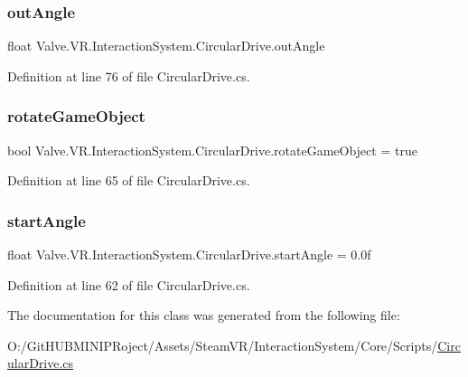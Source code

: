\subsubsection{\texorpdfstring{outAngle}{outAngle}}
{\footnotesize\ttfamily float Valve.\+V\+R.\+Interaction\+System.\+Circular\+Drive.\+out\+Angle}



Definition at line 76 of file Circular\+Drive.\+cs.

\mbox{\label{class_valve_1_1_v_r_1_1_interaction_system_1_1_circular_drive_a35df98d8e3d550859610175298fe32e6}} 
\subsubsection{\texorpdfstring{rotateGameObject}{rotateGameObject}}
{\footnotesize\ttfamily bool Valve.\+V\+R.\+Interaction\+System.\+Circular\+Drive.\+rotate\+Game\+Object = true}



Definition at line 65 of file Circular\+Drive.\+cs.

\mbox{\label{class_valve_1_1_v_r_1_1_interaction_system_1_1_circular_drive_aeb873828f646a744d57bd77b8ef7b1bd}} 
\subsubsection{\texorpdfstring{startAngle}{startAngle}}
{\footnotesize\ttfamily float Valve.\+V\+R.\+Interaction\+System.\+Circular\+Drive.\+start\+Angle = 0.\+0f}



Definition at line 62 of file Circular\+Drive.\+cs.



The documentation for this class was generated from the following file\+:\begin{DoxyCompactItemize}
\item 
O\+:/\+Git\+H\+U\+B\+M\+I\+N\+I\+P\+Roject/\+Assets/\+Steam\+V\+R/\+Interaction\+System/\+Core/\+Scripts/\mbox{\hyperlink{_circular_drive_8cs}{Circular\+Drive.\+cs}}\end{DoxyCompactItemize}
